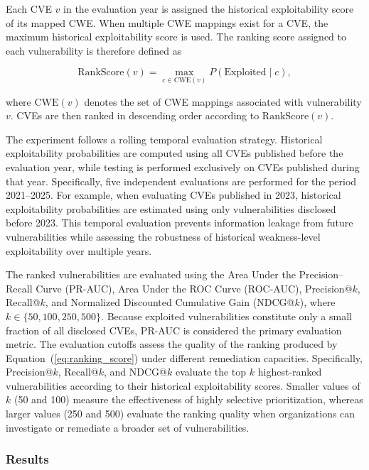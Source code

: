 \documentclass[conference,compsoc]{IEEEtran}
\begin{document}
Each CVE $v$ in the evaluation year is assigned the historical exploitability score of its mapped CWE. When multiple CWE mappings exist for a CVE, the maximum historical exploitability score is used. The ranking score assigned to each vulnerability is therefore defined as

\begin{equation}
\mathrm{RankScore}(v)=
\max_{c \in \mathrm{CWE}(v)}
P(\mathrm{Exploited}\mid c),
\label{eq:ranking_score}
\end{equation}

where $\mathrm{CWE}(v)$ denotes the set of CWE mappings associated with vulnerability $v$. CVEs are then ranked in descending order according to $\mathrm{RankScore}(v)$.


The experiment follows a rolling temporal evaluation strategy. Historical exploitability probabilities are computed using all CVEs published before the evaluation year, while testing is performed exclusively on CVEs published during that year. Specifically, five independent evaluations are performed for the period 2021--2025. For example, when evaluating CVEs published in 2023, historical exploitability probabilities are estimated using only vulnerabilities disclosed before 2023. This temporal evaluation prevents information leakage from future vulnerabilities while assessing the robustness of historical weakness-level exploitability over multiple years.


The ranked vulnerabilities are evaluated using the Area Under the Precision--Recall Curve (PR-AUC), Area Under the ROC Curve (ROC-AUC), Precision@$k$, Recall@$k$, and Normalized Discounted Cumulative Gain (NDCG@$k$), where $k \in \{50,100,250,500\}$. Because exploited vulnerabilities constitute only a small fraction of all disclosed CVEs, PR-AUC is considered the primary evaluation metric. The evaluation cutoffs assess the quality of the ranking produced by Equation~(\ref{eq:ranking_score}) under different remediation capacities. Specifically, Precision@$k$, Recall@$k$, and NDCG@$k$ evaluate the top $k$ highest-ranked vulnerabilities according to their historical exploitability scores. Smaller values of $k$ (50 and 100) measure the effectiveness of highly selective prioritization, whereas larger values (250 and 500) evaluate the ranking quality when organizations can investigate or remediate a broader set of vulnerabilities.


\subsubsection{Results}
\end{document}
